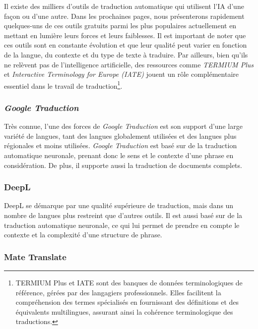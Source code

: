 \documentclass[
  letterpaper,
  DIV=11,
  numbers=noendperiod,
  oneside]{scrreprt}
\begin{document}
Il existe des milliers d'outils de traduction automatique qui utilisent
l'IA d'une façon ou d'une autre. Dans les prochaines pages, nous
présenterons rapidement quelques-uns de ces outils gratuits parmi les
plus populaires actuellement en mettant en lumière leurs forces et leurs
faiblesses. Il est important de noter que ces outils sont en constante
évolution et que leur qualité peut varier en fonction de la langue, du
contexte et du type de texte à traduire. Par ailleurs, bien qu'ils ne
relèvent pas de l'intelligence artificielle, des ressources comme
\emph{TERMIUM Plus} et \emph{Interactive Terminology for Europe (IATE)}
jouent un rôle complémentaire essentiel dans le travail de
traduction\footnote{TERMIUM Plus et IATE sont des banques de données
  terminologiques de référence, gérées par des langagiers
  professionnels. Elles facilitent la compréhension des termes
  spécialisés en fournissant des définitions et des équivalents
  multilingues, assurant ainsi la cohérence terminologique des
  traductions.}.

\hypertarget{google-traduction}{%
\subsubsection{\texorpdfstring{\emph{Google
Traduction}}{Google Traduction}}\label{google-traduction}}

Très connue, l'une des forces de \emph{Google Traduction} est son
support d'une large variété de langues, tant des langues globalement
utilisées et des langues plus régionales et moins utilisées.
\emph{Google Traduction} est basé sur de la traduction automatique
neuronale, prenant donc le sens et le contexte d'une phrase en
considération. De plus, il supporte aussi la traduction de documents
complets.

\hypertarget{deepl}{%
\subsubsection{DeepL}\label{deepl}}

DeepL se démarque par une qualité supérieure de traduction, mais dans un
nombre de langues plus restreint que d'autres outils. Il est aussi basé
sur de la traduction automatique neuronale, ce qui lui permet de prendre
en compte le contexte et la complexité d'une structure de phrase.

\hypertarget{mate-translate}{%
\subsubsection{Mate Translate}\label{mate-translate}}
\end{document}
